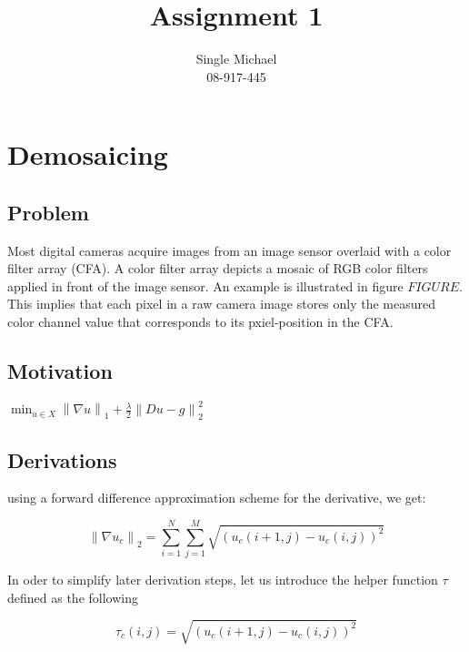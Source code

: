 \documentclass{paper}
\title{Assignment 1}
\author{Single Michael\\08-917-445}
\newcommand{\norm}[1]{\left\lVert#1\right\rVert}
\begin{document}
\maketitle


%

\section{Demosaicing}
\subsection{Problem}
Most digital cameras acquire images from an image sensor overlaid with a color filter array (CFA). A color filter array depicts a mosaic of RGB color filters applied in front of the image sensor. An example is illustrated in figure $FIGURE$. This implies that each pixel in a raw camera image stores only the measured color channel value that corresponds to its pxiel-position in the CFA.




\subsection{Motivation}
$\min_{u \in X} \norm{\nabla u}_1 + \frac{\lambda}{2} \norm{Du - g}^2_2$

\subsection{Derivations}

using a forward difference approximation scheme for the derivative, we get:

\begin{equation}
	 \norm{\nabla{u_{c}}}_2 
	= \sum_{i=1}^N \sum_{j=1}^M \sqrt{\left( u_{c}\left(i+1, j\right) - u_{c}\left(i,j\right) \right)^2}
\label{eq:regularization_expr}
\end{equation}

In oder to simplify later derivation steps, let us introduce the helper function $\tau$ defined as the following 

\begin{equation}
	 \tau_{c}\left(i,j\right)
	= \sqrt{\left( u_{c}\left(i+1, j\right) - u_{c}\left(i,j\right) \right)^2}
\end{equation}
\end{document}
